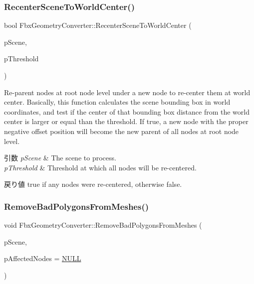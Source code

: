 \subsubsection{\texorpdfstring{Recenter\+Scene\+To\+World\+Center()}{RecenterSceneToWorldCenter()}}
{\footnotesize\ttfamily bool Fbx\+Geometry\+Converter\+::\+Recenter\+Scene\+To\+World\+Center (\begin{DoxyParamCaption}\item[{\hyperlink{class_fbx_scene}{Fbx\+Scene} $\ast$}]{p\+Scene,  }\item[{\hyperlink{fbxtypes_8h_a171e72a1c46fc15c1a6c9c31948c1c5b}{Fbx\+Double}}]{p\+Threshold }\end{DoxyParamCaption})}

Re-\/parent nodes at root node level under a new node to re-\/center them at world center. Basically, this function calculates the scene bounding box in world coordinates, and test if the center of that bounding box distance from the world center is larger or equal than the threshold. If true, a new node with the proper negative offset position will become the new parent of all nodes at root node level. 
\begin{DoxyParams}{引数}
{\em p\+Scene} & The scene to process. \\
\hline
{\em p\+Threshold} & Threshold at which all nodes will be re-\/centered. \\
\hline
\end{DoxyParams}
\begin{DoxyReturn}{戻り値}
{\ttfamily true} if any nodes were re-\/centered, otherwise {\ttfamily false}. 
\end{DoxyReturn}
\mbox{\label{class_fbx_geometry_converter_ae9f8c321399875d9d5df3ae49ebf428d}} 
\subsubsection{\texorpdfstring{Remove\+Bad\+Polygons\+From\+Meshes()}{RemoveBadPolygonsFromMeshes()}}
{\footnotesize\ttfamily void Fbx\+Geometry\+Converter\+::\+Remove\+Bad\+Polygons\+From\+Meshes (\begin{DoxyParamCaption}\item[{\hyperlink{class_fbx_scene}{Fbx\+Scene} $\ast$}]{p\+Scene,  }\item[{\hyperlink{class_fbx_array}{Fbx\+Array}$<$ \hyperlink{class_fbx_node}{Fbx\+Node} $\ast$$>$ $\ast$}]{p\+Affected\+Nodes = {\ttfamily \hyperlink{fbxarch_8h_a070d2ce7b6bb7e5c05602aa8c308d0c4}{N\+U\+LL}} }\end{DoxyParamCaption})}

